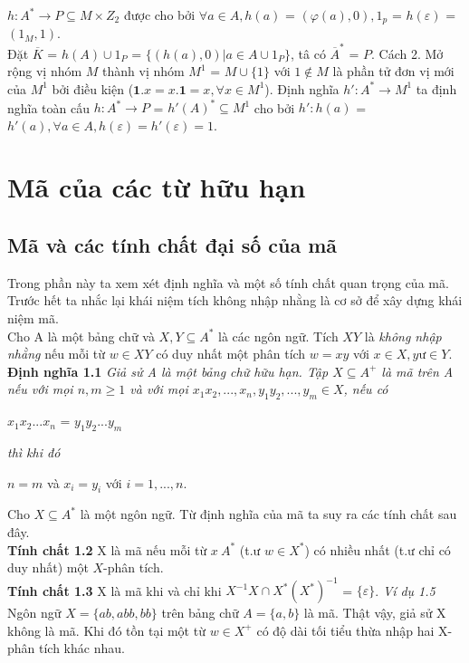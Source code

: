 \begin{flushleft}
\begin{flushleft}
$h : A^* \to P \subseteq M \times Z_2$ được cho bởi $\forall a \in A, h(a)$ = $(\varphi (a) , 0), 1_p$ = $h(\varepsilon)$ = $(1_M, 1)$.\\
Đặt $\overline{K}$ = $h(A) \cup 1_P$ = $\{ (h(a), 0) | a \in A \cup 1_P \}$, tâ có $\overline{A}^*$ = $P$.
\hspace{10mm}Cách 2. Mở rộng vị nhóm $M$ thành vị nhóm $M^1$ = $M \cup \{1\}$ với $1 \not\in M$ là phần tử đơn vị mới của $M^1$ bởi điều kiện ($\textbf{1}.x = x.\textbf{1} = x, \forall x \in M^1$).
\hspace{10mm}Định nghĩa $h' : A^* \to M^1$ ta định nghĩa toàn cấu $h : A^* \to P$ = $h'(A)^* \subseteq M^1$ cho bởi $h' : h(a)$ = $h'(a), \forall a \in A, h(\varepsilon) = h'(\varepsilon) = 1$.
\section{Mã của các từ hữu hạn}
\subsection{Mã và các tính chất đại số của mã}
Trong phần này ta xem xét định nghĩa và một số tính chất quan trọng của mã. Trước hết ta nhắc lại khái niệm tích không nhập nhằng là cơ sở để xây dựng khái niệm mã.\\
\hspace{10mm}Cho A là một bảng chữ và $X, Y \subseteq A^*$ là các ngôn ngữ. Tích $XY$ là \textit{không nhập nhằng} nếu mỗi từ $w \in XY$ có duy nhất một phân tích $w = xy$ với $x \in X, y ư\in Y$.\\
\textbf{Định nghĩa 1.1}     \textit{Giả sử A là một bảng chữ hữu hạn. Tập $X \subseteq A^+ $ là mã trên A nếu với mọi $n,m \ge 1$ và với mọi $x_1x_2,...,x_n,y_1y_2,...,y_m \in X$, nếu có} 
\end{flushleft}
\end{flushleft}
$x_1x_2...x_n$ = $y_1y_2...y_m$
\begin{flushleft}
\textit{thì khi đó}
\end{flushleft}
$n = m$ và  $x_i = y_i$     với     $i = 1,...,n$.
\begin{flushleft}
Cho $X \subseteq A^*$ là một ngôn ngữ. Từ định nghĩa của mã ta suy ra các tính chất sau đây.\\
\textbf{Tính chất 1.2}      X là mã nếu mỗi từ $x \ A^*$ (t.ư $w \in X^*$) có nhiều nhất (t.ư chỉ có duy nhất) một $X$-phân tích.\\
\textbf{Tính chất 1.3}    X là mã khi và chỉ khi $X^{-1}X \cap X^*(X^*)^{-1}$ = $\{ \varepsilon \}$.
\textit{Ví dụ 1.5}  Ngôn ngữ $X = \{ ab,abb,bb \}$ trên bảng chữ $A = \{ a,b \}$ là mã. Thật vậy, giả sử X không là mã. Khi đó tồn tại một từ $w \in X^+$ có độ dài tối tiểu thừa nhập hai X-phân tích khác nhau.
\end{flushleft}
